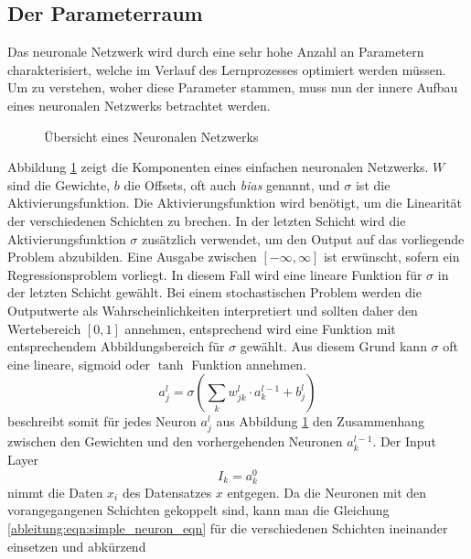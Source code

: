 \subsection{Der Parameterraum}
Das neuronale Netzwerk wird durch eine sehr hohe Anzahl an Parametern charakterisiert, welche im Verlauf des Lernprozesses optimiert werden müssen. Um zu verstehen, woher diese Parameter stammen, muss nun der innere Aufbau eines neuronalen Netzwerks betrachtet werden.
\begin{figure}
	\begin{center}
		
		\caption{Übersicht eines Neuronalen Netzwerks}
		\label{ableitung:fig:neuronal_network}
	\end{center}
\end{figure} 
Abbildung \ref{ableitung:fig:neuronal_network} zeigt die Komponenten eines einfachen neuronalen Netzwerks. $W$ sind die Gewichte, $b$ die Offsets, oft auch \textit{bias} genannt, und $\sigma$ ist die Aktivierungsfunktion. Die Aktivierungsfunktion wird benötigt, um die Linearität der verschiedenen Schichten zu brechen. In der letzten Schicht wird die Aktivierungsfunktion $\sigma$ zusätzlich verwendet, um den Output auf das vorliegende Problem abzubilden. Eine Ausgabe zwischen $[-\infty, \infty]$ ist erwünscht, sofern ein Regressionsproblem vorliegt. In diesem Fall wird eine lineare Funktion für $\sigma$ in der letzten Schicht gewählt. Bei einem stochastischen Problem werden die Outputwerte als Wahrscheinlichkeiten interpretiert und sollten daher den Wertebereich $[0,1]$ annehmen, entsprechend wird eine Funktion mit entsprechendem Abbildungsbereich für $\sigma$ gewählt. Aus diesem Grund kann $\sigma$ oft eine lineare, sigmoid oder $\tanh$ Funktion annehmen.
\begin{equation}
a^{l}_{j} = \sigma \left( \sum\limits_{k}w^{l}_{jk} \cdot a^{l-1}_{k}+b^{l}_{j} \right)
\label{ableitung:eqn:simple_neuron_eqn}
\end{equation}
beschreibt somit für jedes Neuron $a^{l}_{j}$ aus Abbildung \ref{ableitung:fig:neuronal_network} den Zusammenhang zwischen den Gewichten und den vorhergehenden Neuronen $a^{l-1}_{k}$. Der Input Layer 
\begin{equation}
I_k = a_{k}^{0}
\end{equation}
nimmt die Daten $x_i$ des Datensatzes $x$ entgegen.
Da die Neuronen mit den vorangegangenen Schichten gekoppelt sind, kann man die Gleichung \eqref{ableitung:eqn:simple_neuron_eqn} für die verschiedenen Schichten ineinander einsetzen und abkürzend
